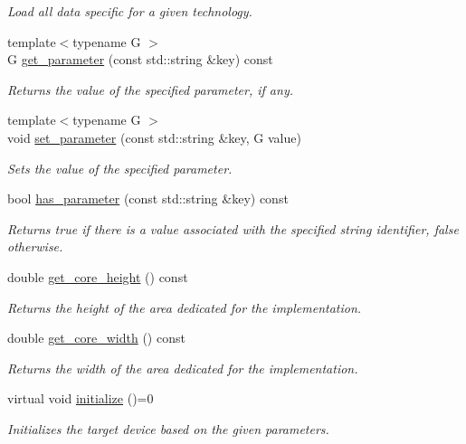 \begin{DoxyCompactItemize}
\begin{DoxyCompactList}\small\item\em Load all data specific for a given technology. \end{DoxyCompactList}\item 
{\footnotesize template$<$typename G $>$ }\\G \hyperlink{classtarget__device_a8661666c67663c3826ecd5f92f3e8711}{get\+\_\+parameter} (const std\+::string \&key) const
\begin{DoxyCompactList}\small\item\em Returns the value of the specified parameter, if any. \end{DoxyCompactList}\item 
{\footnotesize template$<$typename G $>$ }\\void \hyperlink{classtarget__device_a4112dad098867bd963a236a7374d4ba8}{set\+\_\+parameter} (const std\+::string \&key, G value)
\begin{DoxyCompactList}\small\item\em Sets the value of the specified parameter. \end{DoxyCompactList}\item 
bool \hyperlink{classtarget__device_a1ecf11f7b98c92c243f93a10d919f375}{has\+\_\+parameter} (const std\+::string \&key) const
\begin{DoxyCompactList}\small\item\em Returns true if there is a value associated with the specified string identifier, false otherwise. \end{DoxyCompactList}\item 
double \hyperlink{classtarget__device_ab1d0e5d9f527fe5d96db50e718fdc09e}{get\+\_\+core\+\_\+height} () const
\begin{DoxyCompactList}\small\item\em Returns the height of the area dedicated for the implementation. \end{DoxyCompactList}\item 
double \hyperlink{classtarget__device_a9629242b6f9f54f51105cdebf9835442}{get\+\_\+core\+\_\+width} () const
\begin{DoxyCompactList}\small\item\em Returns the width of the area dedicated for the implementation. \end{DoxyCompactList}\item 
virtual void \hyperlink{classtarget__device_a8036fcb32879f6d3acd5b3f71a457a3e}{initialize} ()=0
\begin{DoxyCompactList}\small\item\em Initializes the target device based on the given parameters. \end{DoxyCompactList}\item 

\end{DoxyCompactItemize}
